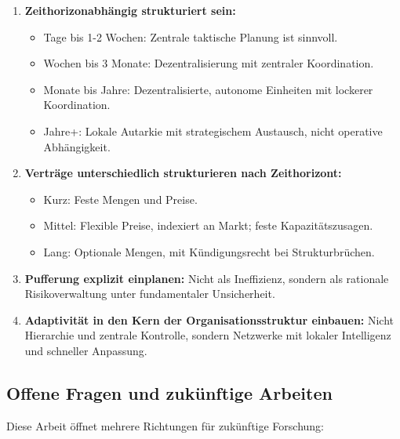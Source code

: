\documentclass[a4paper, 12pt, twoside, openright]{report}
\theoremstyle{definition}
\theoremstyle{definition}
\begin{document}
\begin{enumerate}
  \item \textbf{Zeithorizonabhängig strukturiert sein:}
  \begin{itemize}
    \item Tage bis 1-2 Wochen: Zentrale taktische Planung ist sinnvoll.
    \item Wochen bis 3 Monate: Dezentralisierung mit zentraler Koordination.
    \item Monate bis Jahre: Dezentralisierte, autonome Einheiten mit lockerer Koordination.
    \item Jahre+: Lokale Autarkie mit strategischem Austausch, nicht operative Abhängigkeit.
  \end{itemize}
  
  \item \textbf{Verträge unterschiedlich strukturieren nach Zeithorizont:}
  \begin{itemize}
    \item Kurz: Feste Mengen und Preise.
    \item Mittel: Flexible Preise, indexiert an Markt; feste Kapazitätszusagen.
    \item Lang: Optionale Mengen, mit Kündigungsrecht bei Strukturbrüchen.
  \end{itemize}
  
  \item \textbf{Pufferung explizit einplanen:} Nicht als Ineffizienz, sondern als rationale Risikoverwaltung unter fundamentaler Unsicherheit.
  
  \item \textbf{Adaptivität in den Kern der Organisationsstruktur einbauen:} Nicht Hierarchie und zentrale Kontrolle, sondern Netzwerke mit lokaler Intelligenz und schneller Anpassung.
\end{enumerate}

\subsection{Offene Fragen und zukünftige Arbeiten}

Diese Arbeit öffnet mehrere Richtungen für zukünftige Forschung:
\end{document}
